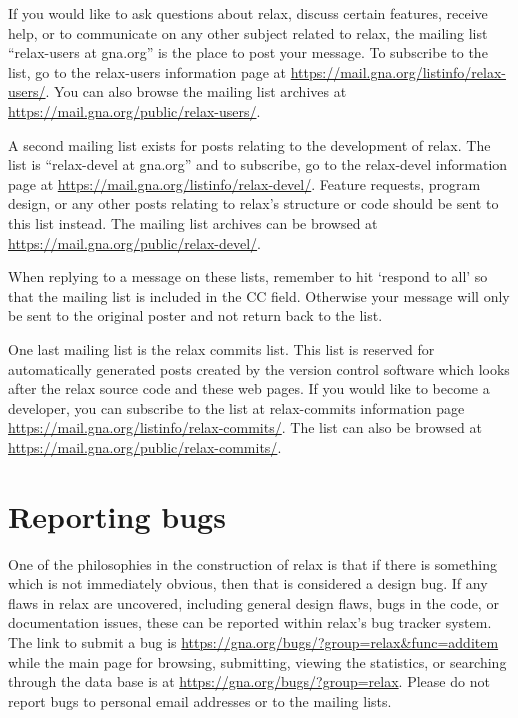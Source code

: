 If you would like to ask questions about relax, discuss certain features, receive help, or to communicate on any other subject related to relax, the mailing list ``relax-users at gna.org'' is the place to post your message.  To subscribe to the list, go to the relax-users information page at \href{https://mail.gna.org/listinfo/relax-users/}{https://mail.gna.org/listinfo/relax-users/}.  You can also browse the mailing list archives at \href{https://mail.gna.org/public/relax-users/}{https://mail.gna.org/public/relax-users/}.

A second mailing list exists for posts relating to the development of relax.  The list is ``relax-devel at gna.org'' and to subscribe, go to the relax-devel information page at \href{https://mail.gna.org/listinfo/relax-devel/}{https://mail.gna.org/listinfo/relax-devel/}.  Feature requests, program design, or any other posts relating to relax's structure or code should be sent to this list instead.  The mailing list archives can be browsed at \href{https://mail.gna.org/public/relax-devel/}{https://mail.gna.org/public/relax-devel/}.

When replying to a message on these lists, remember to hit `respond to all' so that the mailing list is included in the CC field.  Otherwise your message will only be sent to the original poster and not return back to the list.

One last mailing list is the relax commits list.  This list is reserved for automatically generated posts created by the version control software which looks after the relax source code and these web pages.  If you would like to become a developer, you can subscribe to the list at relax-commits information page \href{https://mail.gna.org/listinfo/relax-commits/}{https://mail.gna.org/listinfo/relax-commits/}. The list can also be browsed at \href{https://mail.gna.org/public/relax-commits/}{https://mail.gna.org/public/relax-commits/}.




\section{Reporting bugs}

One of the philosophies in the construction of relax is that if there is something which is not immediately obvious, then that is considered a design bug.  If any flaws in relax are uncovered, including general design flaws, bugs in the code, or documentation issues, these can be reported within relax's bug tracker system.  The link to submit a bug is \href{https://gna.org/bugs/?group=relax\&func=additem}{https://gna.org/bugs/?group=relax\&func=additem} while the main page for browsing, submitting, viewing the statistics, or searching through the data base is at \href{https://gna.org/bugs/?group=relax}{https://gna.org/bugs/?group=relax}.  Please do not report bugs to personal email addresses or to the mailing lists.

